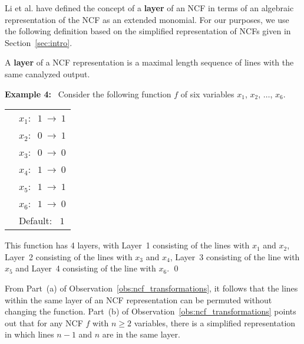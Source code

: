 \noindent
Li et al. \cite{Li-etal-2013} have defined the concept of a 
{\bf layer} of an NCF in terms of
an algebraic representation of the NCF as an extended monomial.
For our purposes, we use the following definition based on the
simplified representation of NCFs given in Section~\ref{sec:intro}.

\begin{definition}
\label{def:layer}
A {\bf layer} of a NCF representation is a maximal length sequence 
of lines with the same canalyzed output.
\end{definition}

\noindent
\textbf{Example 4:}~ Consider the following function $f$ of six variables
$x_1$, $x_2$, $\ldots$, $x_6$. 

\bigskip

\noindent
\begin{tabular}{ll}
\hspace*{1.1in} & $x_1:~$  $1 ~\longrightarrow~ 1$ \\ [0.5ex]
\hspace*{1.1in} & $x_2:~$  $0 ~\longrightarrow~ 1$ \\ [0.5ex]
\hspace*{1.1in} & $x_3:~$  $0 ~\longrightarrow~ 0$ \\ [0.5ex]
\hspace*{1.1in} & $x_4:~$  $1 ~\longrightarrow~ 0$ \\ [0.5ex]
\hspace*{1.1in} & $x_5:~$  $1 ~\longrightarrow~ 1$ \\ [0.5ex]
\hspace*{1.1in} & $x_6:~$  $1 ~\longrightarrow~ 0$ \\ [0.5ex]
\hspace*{1.1in} & Default:~ $1$ \\
\end{tabular}

\medskip
\noindent
This function has 4 layers, with 
Layer~1 consisting of the lines with $x_1$ and $x_2$, 
Layer~2 consisting of the lines with $x_3$ and $x_4$, 
Layer~3 consisting of the line with $x_5$ and 
Layer~4 consisting of the line with $x_6$. \qed

\medskip
From Part~(a) of Observation~\ref{obs:ncf_transformations},
it follows that the lines within the same layer of an NCF
representation can be permuted without changing the function.
Part~(b) of Observation~\ref{obs:ncf_transformations} points
out that for any NCF $f$ with $n \geq 2$ variables, there is a simplified 
representation in which lines $n-1$ and $n$ are in the same layer.

